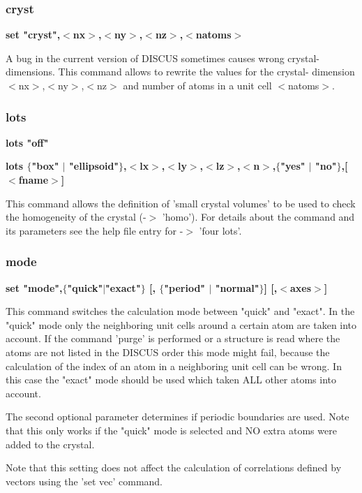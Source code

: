 \subsubsection{cryst}
{\bf set "cryst",$ <$nx$> $,$ <$ny$> $,$ <$nz$> $,$ <$natoms$> $ \par }
\par
\vspace{3pt}
A bug in the current version of DISCUS sometimes causes wrong crystal- 
dimensions. This command allows to rewrite the values for the crystal- 
dimension $ <$nx$> $,$ <$ny$> $,$ <$nz$> $ and number of atoms in a unit cell $ <$natoms$> $. 
\subsubsection{lots}
{\bf lots "off" \par }
{\bf lots $ \{$"box" $| $ "ellipsoid"$\} $,$ <$lx$> $,$ <$ly$> $,$ <$lz$> $,$ <$n$> $,$ \{$"yes" $| $ "no"$\} $,[$ <$fname$> $] \par }
\par
\vspace{3pt}
This command allows the definition of 'small crystal volumes' to 
be used to check the homogeneity of the crystal (-$> $ 'homo'). 
For details about the command and its parameters see the help file 
entry for -$> $ 'four lots'. 
\subsubsection{mode}
{\bf set "mode",$ \{$"quick"$| $"exact"$\} $ [, $ \{$"period" $| $ "normal"$\} $] [,$ <$axes$> $] \par }
\par
\vspace{3pt}
This command switches the calculation mode between "quick" and "exact". 
In the "quick" mode only the neighboring unit cells around a certain 
atom are taken into account. If the command 'purge' is performed or a 
structure is read where the atoms are not listed in the DISCUS order 
this mode might fail, because the calculation of the index of an atom 
in a neighboring unit cell can be wrong. In this case the "exact" mode 
should be used which taken ALL other atoms into account. 
\par
The second optional parameter determines if periodic boundaries are 
used. Note that this only works if the "quick" mode is selected and 
NO extra atoms were added to the crystal. 
\par
Note that this setting does not affect the calculation of correlations 
defined by vectors using the 'set vec' command. 
